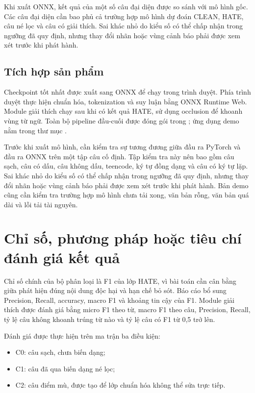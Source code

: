 \documentclass[12pt,a4paper]{article}
\newcommand{\sourcepath}[1]{\texttt{\detokenize{#1}}}
\begin{document}
Khi xuất ONNX, kết quả của một số câu đại diện được so sánh với mô hình gốc. Các câu đại diện cần bao phủ cả trường hợp mô hình dự đoán CLEAN, HATE, câu né lọc và câu có giải thích. Sai khác nhỏ do kiểu số có thể chấp nhận trong ngưỡng đã quy định, nhưng thay đổi nhãn hoặc vùng cảnh báo phải được xem xét trước khi phát hành.

\subsection{Tích hợp sản phẩm}
Checkpoint tốt nhất được xuất sang ONNX để chạy trong trình duyệt. Phía trình duyệt thực hiện chuẩn hóa, tokenization và suy luận bằng ONNX Runtime Web. Module giải thích chạy sau khi có kết quả HATE, sử dụng occlusion để khoanh vùng từ ngữ. Toàn bộ pipeline đầu-cuối được đóng gói trong \sourcepath{src/pipeline.py}; ứng dụng demo nằm trong thư mục \sourcepath{demo/}.

Trước khi xuất mô hình, cần kiểm tra sự tương đương giữa đầu ra PyTorch và đầu ra ONNX trên một tập câu cố định. Tập kiểm tra này nên bao gồm câu sạch, câu có dấu, câu không dấu, teencode, ký tự đồng dạng và câu có ký tự lặp. Sai khác nhỏ do kiểu số có thể chấp nhận trong ngưỡng đã quy định, nhưng thay đổi nhãn hoặc vùng cảnh báo phải được xem xét trước khi phát hành. Bản demo cũng cần kiểm tra trường hợp mô hình chưa tải xong, văn bản rỗng, văn bản quá dài và lỗi tải tài nguyên.

\section{Chỉ số, phương pháp hoặc tiêu chí đánh giá kết quả}
Chỉ số chính của bộ phân loại là F1 của lớp HATE, vì bài toán cần cân bằng giữa phát hiện đúng nội dung độc hại và hạn chế bỏ sót. Báo cáo bổ sung Precision, Recall, accuracy, macro F1 và khoảng tin cậy của F1. Module giải thích được đánh giá bằng micro F1 theo từ, macro F1 theo câu, Precision, Recall, tỷ lệ câu không khoanh trúng từ nào và tỷ lệ câu có F1 từ 0,5 trở lên.

Đánh giá được thực hiện trên ma trận ba điều kiện:
\begin{itemize}
  \item C0: câu sạch, chưa biến dạng;
  \item C1: câu đã qua biến dạng né lọc;
  \item C2: câu điểm mù, được tạo để lớp chuẩn hóa không thể sửa trực tiếp.
\end{itemize}
\end{document}

